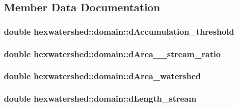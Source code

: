 \subsection{Member Data Documentation}
\hypertarget{classhexwatershed_1_1domain_ab3b0972033f100aa1080c709c4bc1ee1}{
\subsubsection[{d\-Accumulation\-\_\-threshold}]{\setlength{\rightskip}{0pt plus 5cm}double hexwatershed\-::domain\-::d\-Accumulation\-\_\-threshold}}\label{classhexwatershed_1_1domain_ab3b0972033f100aa1080c709c4bc1ee1}
\hypertarget{classhexwatershed_1_1domain_a87acb765b1435ff5f6cb08a5af07d834}{
\subsubsection[{d\-Area\-\_\-2\-\_\-stream\-\_\-ratio}]{\setlength{\rightskip}{0pt plus 5cm}double hexwatershed\-::domain\-::d\-Area\-\_\-\_\-stream\-\_\-ratio}}\label{classhexwatershed_1_1domain_a87acb765b1435ff5f6cb08a5af07d834}
\hypertarget{classhexwatershed_1_1domain_a9e795c0653f95505ef7644911000ad67}{
\subsubsection[{d\-Area\-\_\-watershed}]{\setlength{\rightskip}{0pt plus 5cm}double hexwatershed\-::domain\-::d\-Area\-\_\-watershed}}\label{classhexwatershed_1_1domain_a9e795c0653f95505ef7644911000ad67}
\hypertarget{classhexwatershed_1_1domain_a2c358b846c8211809a2ff82708b57fcd}{
\subsubsection[{d\-Length\-\_\-stream}]{\setlength{\rightskip}{0pt plus 5cm}double hexwatershed\-::domain\-::d\-Length\-\_\-stream}}\label{classhexwatershed_1_1domain_a2c358b846c8211809a2ff82708b57fcd}
